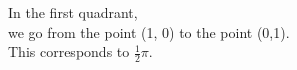 \documentclass[preview]{standalone}
\begin{document}
\begin{center}
In the first quadrant,\\ we go from the point (1, 0) to the point (0,1). \\ This corresponds to $\frac{1}{2} \pi$.
\end{center}
\end{document}
